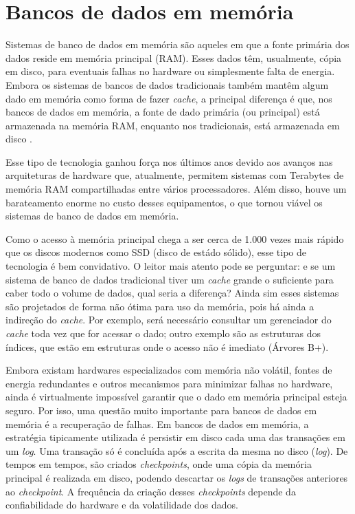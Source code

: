 \section{Bancos de dados em memória}

Sistemas de banco de dados em memória são aqueles em que a fonte primária dos dados reside 
em memória principal (RAM). Esses dados têm, usualmente, cópia em disco, para eventuais falhas 
no hardware ou simplesmente falta de energia. Embora os sistemas de bancos de dados tradicionais 
também mantêm algum dado em memória como forma de fazer \textit{cache}, a principal diferença é 
que, nos bancos de dados em memória, a fonte de dado primária (ou principal) está 
armazenada na memória RAM, enquanto nos tradicionais, está armazenada em disco 
\cite{garcia1992main, dewitt1984implementation}.

Esse tipo de tecnologia ganhou força nos últimos anos devido aos avanços nas arquiteturas de 
hardware que, atualmente, permitem sistemas com Terabytes de memória RAM compartilhadas entre 
vários processadores. Além disso, houve um barateamento enorme no custo desses equipamentos, o 
que tornou viável os sistemas de banco de dados em memória. 

Como o acesso à memória principal chega a ser cerca de 1.000 vezes mais rápido que os discos modernos 
como SSD (disco de estádo sólido), esse tipo de tecnologia é bem convidativo. O leitor mais atento 
pode se perguntar: e se um sistema de banco de dados tradicional tiver um \textit{cache} grande o 
suficiente para caber todo o volume de dados, qual seria a diferença? Ainda sim esses sistemas são 
projetados de forma não ótima para uso da memória, pois há ainda a indireção do \textit{cache}. 
Por exemplo, será necessário consultar um gerenciador do \textit{cache} toda vez que for acessar o dado;
outro exemplo são as estruturas dos índices, que estão em estruturas onde o acesso não é imediato (Árvores B+). 

Embora existam hardwares especializados com memória não volátil, fontes de energia redundantes e 
outros mecanismos para minimizar falhas no hardware, ainda é virtualmente impossível garantir que o 
dado em memória principal esteja seguro. Por isso, uma questão muito importante para bancos de dados 
em memória é a recuperação de falhas. Em bancos de dados em memória, a estratégia tipicamente utilizada 
é persistir em disco cada uma das transações em um \textit{log}. Uma transação só é concluída após a 
escrita da mesma no disco (\textit{log}). De tempos em tempos, são criados \textit{checkpoints}, onde 
uma cópia da memória principal é realizada em disco, podendo descartar os \textit{logs} de transações 
anteriores ao \textit{checkpoint}. A frequência da criação desses \textit{checkpoints} depende da 
confiabilidade do hardware e da volatilidade dos dados.

